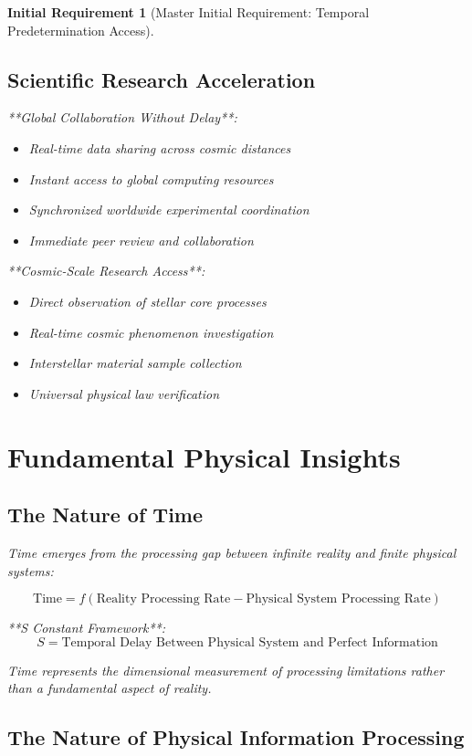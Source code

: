 \documentclass[12pt,a4paper]{article}
\newtheorem{requirement}[theorem]{Initial Requirement}
\theoremstyle{remark}
\begin{document}
\begin{requirement}[Master Initial Requirement: Temporal Predetermination Access]
\subsection{Scientific Research Acceleration}

**Global Collaboration Without Delay**:
\begin{itemize}
\item Real-time data sharing across cosmic distances
\item Instant access to global computing resources
\item Synchronized worldwide experimental coordination
\item Immediate peer review and collaboration
\end{itemize}

**Cosmic-Scale Research Access**:
\begin{itemize}
\item Direct observation of stellar core processes
\item Real-time cosmic phenomenon investigation
\item Interstellar material sample collection
\item Universal physical law verification
\end{itemize}

\section{Fundamental Physical Insights}

\subsection{The Nature of Time}

Time emerges from the processing gap between infinite reality and finite physical systems:

\begin{equation}
\text{Time} = f(\text{Reality Processing Rate} - \text{Physical System Processing Rate})
\end{equation}

**S Constant Framework**:
\begin{equation}
S = \text{Temporal Delay Between Physical System and Perfect Information}
\end{equation}

Time represents the dimensional measurement of processing limitations rather than a fundamental aspect of reality.

\subsection{The Nature of Physical Information Processing}


\end{requirement}
\end{document}
